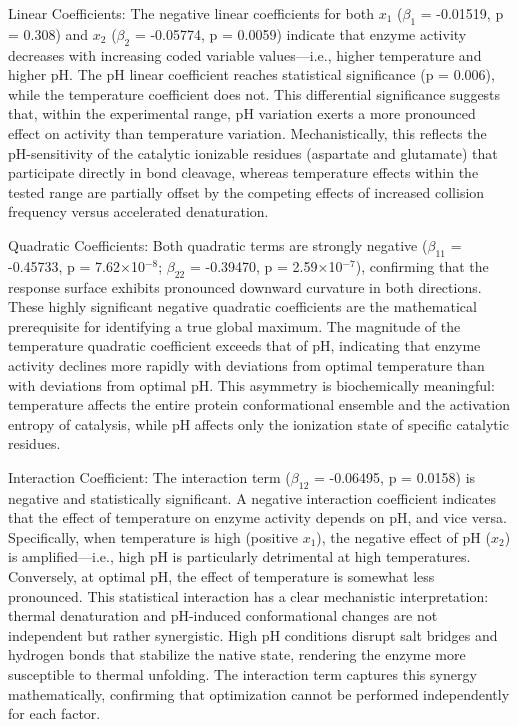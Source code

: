 \documentclass[
  12pt,
]{article}
\begin{document}
Linear Coefficients: The negative linear coefficients for both \(x_1\)
(\(\beta_1\) = -0.01519, p = 0.308) and \(x_2\) (\(\beta_2\) = -0.05774,
p = 0.0059) indicate that enzyme activity decreases with increasing
coded variable values---i.e., higher temperature and higher pH. The pH
linear coefficient reaches statistical significance (p = 0.006), while
the temperature coefficient does not. This differential significance
suggests that, within the experimental range, pH variation exerts a more
pronounced effect on activity than temperature variation.
Mechanistically, this reflects the pH-sensitivity of the catalytic
ionizable residues (aspartate and glutamate) that participate directly
in bond cleavage, whereas temperature effects within the tested range
are partially offset by the competing effects of increased collision
frequency versus accelerated denaturation.

Quadratic Coefficients: Both quadratic terms are strongly negative
(\(\beta_{11}\) = -0.45733, p = 7.62×10\(^{-8}\); \(\beta_{22}\) =
-0.39470, p = 2.59×10\(^{-7}\)), confirming that the response surface
exhibits pronounced downward curvature in both directions. These highly
significant negative quadratic coefficients are the mathematical
prerequisite for identifying a true global maximum. The magnitude of the
temperature quadratic coefficient exceeds that of pH, indicating that
enzyme activity declines more rapidly with deviations from optimal
temperature than with deviations from optimal pH. This asymmetry is
biochemically meaningful: temperature affects the entire protein
conformational ensemble and the activation entropy of catalysis, while
pH affects only the ionization state of specific catalytic residues.

Interaction Coefficient: The interaction term (\(\beta_{12}\) =
-0.06495, p = 0.0158) is negative and statistically significant. A
negative interaction coefficient indicates that the effect of
temperature on enzyme activity depends on pH, and vice versa.
Specifically, when temperature is high (positive \(x_1\)), the negative
effect of pH (\(x_2\)) is amplified---i.e., high pH is particularly
detrimental at high temperatures. Conversely, at optimal pH, the effect
of temperature is somewhat less pronounced. This statistical interaction
has a clear mechanistic interpretation: thermal denaturation and
pH-induced conformational changes are not independent but rather
synergistic. High pH conditions disrupt salt bridges and hydrogen bonds
that stabilize the native state, rendering the enzyme more susceptible
to thermal unfolding. The interaction term captures this synergy
mathematically, confirming that optimization cannot be performed
independently for each factor.
\end{document}
